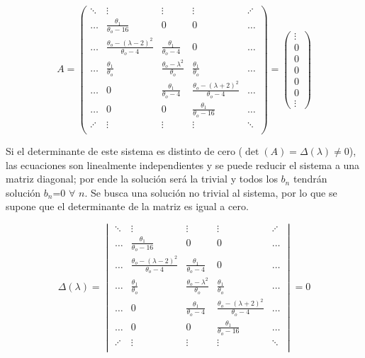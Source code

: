 \large
\begin{equation}\label{eq:E.9}
A=
\begin{pmatrix}
\ddots &  \vdots & \vdots & \vdots &\iddots \\
\dots &  \frac{\theta_1}{\theta_o-16} & 0 & 0 & \dots \\[0.3cm]
\dots  & \frac{\theta_o-(\lambda-2)^2}{\theta_o-4} & \frac{\theta_1}{\theta_o-4} & 0 & \dots\\[0.3cm] 
\dots & \frac{\theta_1}{\theta_o} & \frac{\theta_o-\lambda^2}{\theta_o} & \frac{\theta_1}{\theta_o} & \dots \\[0.3cm]
\ldots & 0 & \frac{\theta_1}{\theta_o-4} & \frac{\theta_o-(\lambda+2)^2}{\theta_o-4} & \dots\\[0.3cm]
\ldots & 0 & 0 & \frac{\theta_1}{\theta_o-16} & \dots \\
\iddots & \vdots & \vdots  & \vdots &\ddots \\
\end{pmatrix}
=\begin{pmatrix}
\vdots\\
0\\[0.3cm]
0\\[0.3cm]
0\\[0.3cm]
0\\[0.3cm]
0\\
\vdots
\end{pmatrix}
\end{equation}
\normalsize

Si el determinante de este sistema es distinto de cero ($\det(A)=\Delta(\lambda)\neq 0$), las ecuaciones son linealmente independientes y se puede reducir el sistema a una matriz diagonal; por ende la solución será la trivial y todos los $b_n$ tendrán solución $b_n$=$0$ $\forall$ $n$. Se busca una solución no trivial al sistema, por lo que se supone que el determinante de la matriz es igual a cero.

\large
\begin{equation}\label{eq:E.10}
\Delta(\lambda)=
\begin{vmatrix}
\ddots  & \vdots & \vdots & \vdots & \iddots \\
\dots &  \frac{\theta_1}{\theta_o-16} & 0 & 0 & \dots \\[0.3cm]
\dots & \frac{\theta_o-(\lambda-2)^2}{\theta_o-4} & \frac{\theta_1}{\theta_o-4} & 0 & \dots\\[0.3cm] 
\dots & \frac{\theta_1}{\theta_o} & \frac{\theta_o-\lambda^2}{\theta_o} & \frac{\theta_1}{\theta_o} & \dots \\[0.3cm]
\ldots & 0 & \frac{\theta_1}{\theta_o-4} & \frac{\theta_o-(\lambda+2)^2}{\theta_o-4}  &  \dots\\[0.3cm] 
\ldots & 0 & 0 & \frac{\theta_1}{\theta_o-16} &  \dots \\
\iddots &  \vdots & \vdots & \vdots  &\ddots \\
\end{vmatrix}=0
\end{equation}
\normalsize


